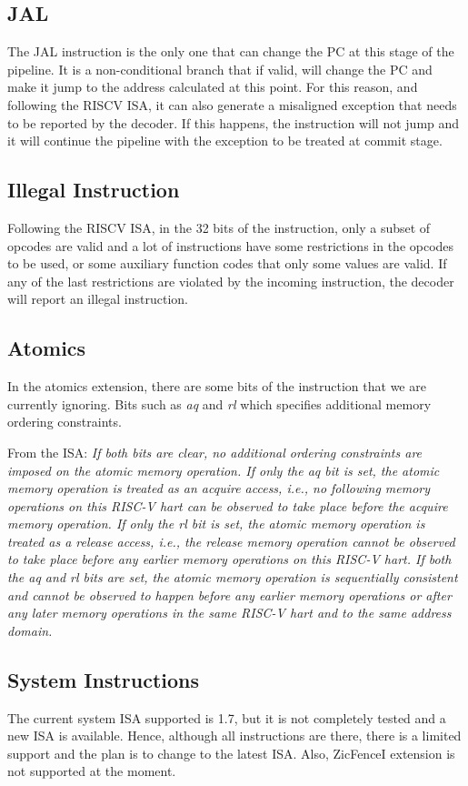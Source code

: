 \subsection{JAL}
The JAL instruction is the only one that can change the PC at this stage of the pipeline. It is a non-conditional branch that if valid, will change the PC and make it jump to the address calculated at this point. For this reason, and following the RISCV ISA, it can also generate a misaligned exception that needs to be reported by the decoder. If this happens, the instruction will not jump and it will continue the pipeline with the exception to be treated at commit stage. 


\subsection{Illegal Instruction}
Following the RISCV ISA, in the 32 bits of the instruction, only a subset of opcodes are valid and a lot of instructions have some restrictions in the opcodes to be used, or some auxiliary function codes that only some values are valid. If any of the last restrictions are violated by the incoming instruction, the decoder will report an illegal instruction.


\subsection{Atomics}
In the atomics extension, there are some bits of the instruction that we are currently ignoring. Bits such as \textit{aq} and \textit{rl} which specifies additional memory ordering constraints.

From the ISA: \textit{If both bits are clear, no additional ordering constraints are imposed on the atomic memory operation. If only the aq bit is set, the atomic memory operation is treated as an acquire access, i.e., no following memory operations on this RISC-V hart can be observed to take place before the	acquire memory operation. If only the rl bit is set, the atomic memory operation is treated as a release access, i.e., the release memory operation cannot be observed to take place before any earlier memory operations on this RISC-V hart. If both the aq and rl bits are set, the atomic memory operation is sequentially consistent and cannot be observed to happen before any earlier memory operations or after any later memory operations in the same RISC-V hart and to the same address	domain.}

\subsection{System Instructions}
The current system ISA supported is 1.7, but it is not completely tested and a new ISA is available. Hence, although all instructions are there, there is a limited support and the plan is to change to the latest ISA. Also, ZicFenceI extension is not supported at the moment.

